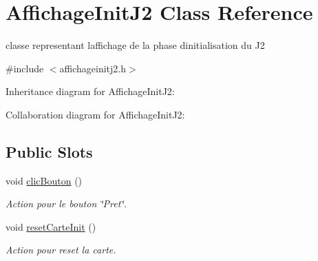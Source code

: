 \hypertarget{class_affichage_init_j2}{}\section{Affichage\+Init\+J2 Class Reference}
\label{class_affichage_init_j2}


classe representant l\textquotesingle{}affichage de la phase d\textquotesingle{}initialisation du J2  




{\ttfamily \#include $<$affichageinitj2.\+h$>$}



Inheritance diagram for Affichage\+Init\+J2\+:


Collaboration diagram for Affichage\+Init\+J2\+:
\subsection*{Public Slots}
\begin{DoxyCompactItemize}
\item 
void \hyperlink{class_affichage_init_j2_ae8ff375ea33c514c71b5500d7d985e00}{clic\+Bouton} ()
\begin{DoxyCompactList}\small\item\em Action pour le bouton \char`\"{}\+Pret\char`\"{}. \end{DoxyCompactList}\item 
void \hyperlink{class_affichage_init_j2_abc45e1837c1612033c6c577a4825769a}{reset\+Carte\+Init} ()
\begin{DoxyCompactList}\small\item\em Action pour reset la carte. \end{DoxyCompactList}\end{DoxyCompactItemize}
